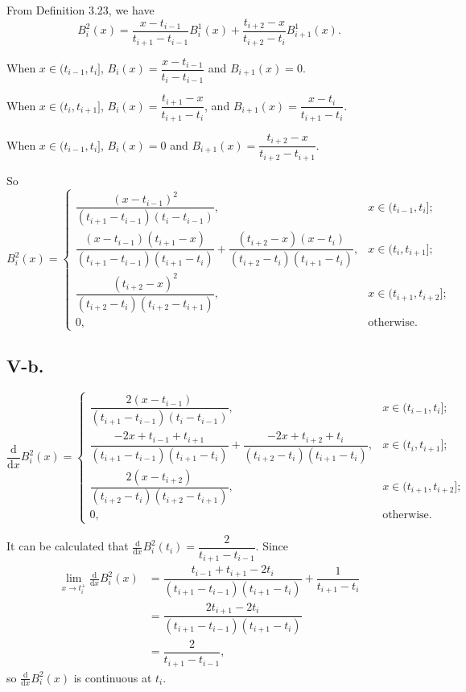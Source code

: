 \documentclass[a4paper]{article}
\begin{document}
From Definition 3.23, we have 
$$B_i^{2}(x)=\frac{x-t_{i-1}}{t_{i+1}-t_{i-1}}B_i^1(x)+\frac{t_{i+2}-x}{t_{i+2}-t_i}B_{i+1}^1(x).$$

When $x\in(t_{i-1},t_i]$, $B_i(x)=\dfrac{x-t_{i-1}}{t_i-t_{i-1}}$ and $B_{i+1}(x)=0$.

When $x\in (t_i,t_{i+1}]$, $B_i(x)=\dfrac{t_{i+1}-x}{t_{i+1}-t_{i}}$, and $B_{i+1}(x)=\dfrac{x-t_{i}}{t_{i+1}-t_{i}}$.

When $x\in(t_{i-1},t_i]$, $B_i(x)=0$ and $B_{i+1}(x)=\dfrac{t_{i+2}-x}{t_{i+2}-t_{i+1}}$.

So 
$$
B_i^2(x)=\begin{cases}
  \dfrac{(x-t_{i-1})^2}{(t_{i+1}-t_{i-1})(t_i-t_{i-1})},&x\in(t_{i-1},t_i];\\
  \dfrac{(x-t_{i-1})(t_{i+1}-x)}{(t_{i+1}-t_{i-1})(t_{i+1}-t_i)}+\dfrac{(t_{i+2}-x)(x-t_i)}{(t_{i+2}-t_i)(t_{i+1}-t_i)},&x\in(t_i,t_{i+1}];\\
  \dfrac{(t_{i+2}-x)^2}{(t_{i+2}-t_i)(t_{i+2}-t_{i+1})},&x\in(t_{i+1},t_{i+2}];\\
  0,&\text{otherwise.}
\end{cases}
$$


\subsection*{V-b.}
$$
\frac{\mathrm{d}}{\mathrm{d}x}B_i^2(x)=\begin{cases}
  \dfrac{2(x-t_{i-1})}{(t_{i+1}-t_{i-1})(t_i-t_{i-1})},&x\in(t_{i-1},t_i];\\
  \dfrac{-2x+t_{i-1}+t_{i+1}}{(t_{i+1}-t_{i-1})(t_{i+1}-t_i)}+\dfrac{-2x+t_{i+2}+t_i}{(t_{i+2}-t_i)(t_{i+1}-t_i)},&x\in(t_i,t_{i+1}];\\
  \dfrac{2(x-t_{i+2})}{(t_{i+2}-t_i)(t_{i+2}-t_{i+1})},&x\in(t_{i+1},t_{i+2}];\\
  0,&\text{otherwise.}
\end{cases}
$$

It can be calculated that $\frac{\mathrm{d}}{\mathrm{d}x}B_i^2(t_i)=\dfrac{2}{t_{i+1}-t_{i-1}}$. Since
$$
\begin{aligned}
  \lim_{x\rightarrow t_{i}^+} \frac{\mathrm{d}}{\mathrm{d}x}B_i^2(x)&=\dfrac{t_{i-1}+t_{i+1}-2t_i}{(t_{i+1}-t_{i-1})(t_{i+1}-t_i)}+\dfrac{1}{t_{i+1}-t_i}\\
  &=\dfrac{2t_{i+1}-2t_i}{(t_{i+1}-t_{i-1})(t_{i+1}-t_i)}\\
  &=\dfrac{2}{t_{i+1}-t_{i-1}},
\end{aligned}
$$
so $\frac{\mathrm{d}}{\mathrm{d}x}B_i^2(x)$ is continuous at $t_i$.
\end{document}
